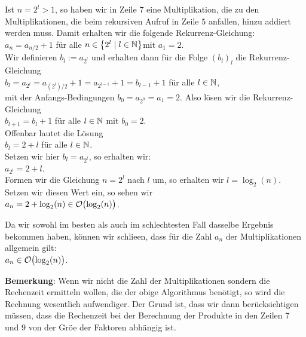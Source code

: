 Ist $n = 2^l > 1$, so  haben wir in Zeile 7 eine Multiplikation, die zu den Multiplikationen, die beim
rekursiven Aufruf in Zeile $5$ anfallen, hinzu addiert werden muss.  Damit erhalten wir
die folgende Rekurrenz-Gleichung: \\[0.1cm]
\hspace*{1.3cm} $a_n = a_{n/2} + 1$ \qquad f\"ur alle $n \in \left\{2^l \mid l \in {\mathbb N}\right\}$\quad mit $a_1 = 2$. \\[0.1cm]
Wir definieren $b_l := a_{2^l}$ und erhalten dann f\"ur die Folge $(b_l)_l$ die
Rekurrenz-Gleichung \\[0.1cm]
\hspace*{1.3cm} 
$b_l = a_{2^l} = a_{(2^l)/2} + 1 = a_{2^{l-1}} + 1 = b_{l-1} + 1$ \qquad f\"ur alle $l\in{\mathbb N}$, \\[0.1cm]
mit der Anfangs-Bedingungen $b_0 = a_{2^0} = a_1 = 2$.
Also l\"osen wir die Rekurrenz-Gleichung \\[0.1cm]
\hspace*{1.3cm} $b_{l+1} = b_l + 1$ \qquad f\"ur alle $l \in {\mathbb N}$ \quad mit $b_0 = 2$.\\[0.1cm]
Offenbar lautet die L\"osung \\[0.1cm]
\hspace*{1.3cm} $b_l = 2 + l$ \qquad f\"ur alle $l\in{\mathbb N}$.
\\[0.1cm]
Setzen wir hier $b_l = a_{2^l}$, so erhalten wir: \\[0.1cm]
\hspace*{1.3cm} $a_{2^l} = 2 + l$. \\[0.1cm]
Formen wir die Gleichung $n = 2^l$ nach $l$ um, so erhalten wir $l =
\log_2(n)$. Setzen wir diesen Wert 
ein, so sehen wir \\[0.1cm]
\hspace*{1.3cm} $a_n = 2 + \log_2(n) \in \mathcal{O}\bigl(\log_2(n)\bigr)$.
\vspace*{0.3cm}

Da wir sowohl im besten als auch im schlechtesten Fall dasselbe Ergebnis bekommen haben,
k\"onnen wir schlie\3en, dass f\"ur die Zahl $a_n$ der Multiplikationen allgemein gilt:\\[0.1cm]
\hspace*{1.3cm} $a_n \in \mathcal{O}\bigl(\log_2(n)\bigr)$.
\vspace*{0.3cm}

\noindent
\textbf{Bemerkung}:  Wenn wir nicht die Zahl der Multiplikationen sondern die Rechenzeit
ermitteln wollen, die der obige Algorithmus ben\"otigt, so wird die Rechnung wesentlich
aufwendiger.  Der Grund ist, dass wir dann ber\"ucksichtigen m\"ussen, dass die Rechenzeit bei
der Berechnung der Produkte in den Zeilen 7 und 9 von der Gr\"o\3e der Faktoren abh\"angig ist.
\vspace*{0.3cm}

